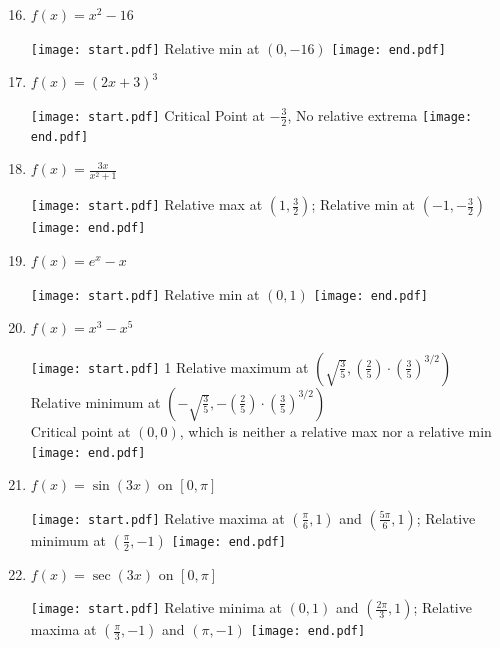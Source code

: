 \documentclass[12pt]{article}
\begin{document}
\begin{enumerate}
\setcounter{enumi}{15}

\item $f(x) = x^2-16$ 

\texttt{[image: start.pdf]}
{{Relative min at $(0,-16)$}}
\texttt{[image: end.pdf]}


\item $f(x) = (2x+3)^3$ 

\texttt{[image: start.pdf]}
{{Critical Point at $-\frac{3}{2}$, No relative extrema}}
\texttt{[image: end.pdf]}


\item $f(x) = \frac{3x}{x^2+1}$ 

\texttt{[image: start.pdf]}
{{Relative max at $\left(1,\frac{3}{2}\right)$; Relative min at $\left(-1,-\frac{3}{2}\right)$}}
\texttt{[image: end.pdf]}


\item $f(x) = e^x-x$ 

\texttt{[image: start.pdf]}
{{Relative min at $(0,1)$}}
\texttt{[image: end.pdf]}


\item $f(x) = x^3-x^5$ 

\texttt{[image: start.pdf]}
{{{1\linewidth}{
Relative maximum at $\left(\sqrt{\frac{3}{5}},\left(\frac{2}{5}\right) \cdot \left(\frac{3}{5}\right)^{3/2}\right)$\\
Relative minimum at $\left(-\sqrt{\frac{3}{5}},-\left(\frac{2}{5}\right) \cdot \left(\frac{3}{5}\right)^{3/2}\right)$\\
Critical point at $(0,0)$, which is neither a relative max nor a relative min}}}
\texttt{[image: end.pdf]}


\end{enumerate}


\begin{enumerate}
\setcounter{enumi}{20}

\item $f(x) = \sin{(3x)}$ on $[0,\pi]$ 

\texttt{[image: start.pdf]}
{{Relative maxima at $\left(\frac{\pi}{6},1\right)$ and $\left(\frac{5\pi}{6},1\right)$; Relative minimum at $\left(\frac{\pi}{2},-1\right)$}}
\texttt{[image: end.pdf]}


\item $f(x) = \sec{(3x)}$ on $[0,\pi]$ 

\texttt{[image: start.pdf]}
{{Relative minima at $(0,1)$ and $\left(\frac{2\pi}{3},1\right)$; Relative maxima at $\left(\frac{\pi}{3},-1\right)$ and $(\pi,-1)$}}
\texttt{[image: end.pdf]}


\end{enumerate}
\end{document}
